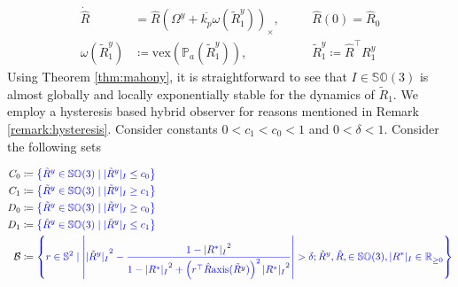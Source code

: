 \documentclass{article}
\newcommand{\SOthree}{\mathbb{SO}(3)}
\newcommand{\axis}[1]{\text{axis}(#1)}
\newcommand{\R}[1]{\mathbb{R}^{#1}}
\newcommand{\Omegay}{\Omega^y}
\newcommand{\vex}[1]{\text{vex}\left(#1\right)}
\newcommand{\brackets}[1]{\left(#1\right)}
\newcommand{\textblue}[1]{\textcolor{blue}{#1}}
\newcommand{\Rtilde}{\tilde{R}}
\newcommand{\normSOthree}[1]{{{\vert}#1 {\vert}_I}}
\newcommand{\Rstar}{{R^*}}
\begin{document}
\begin{subequations}\label{eq:unstable_observer}
\begin{alignat}{3}
    \dot{\hat{R}} &= \hat{R}\left( \Omegay + \overline{k_p}\omega(\Rtilde_1^y)\right)_\times, \quad &&\hat{R}(0) = \hat{R}_0 \\
    \omega(\Rtilde_1^y) &\coloneqq \vex{\mathbb{P}_a({\Rtilde_1^y})}, \quad &&{\Rtilde_1^y \coloneqq \hat{R}^\top R^y_1}
\end{alignat}
\end{subequations}
Using Theorem \ref{thm:mahony}, it is straightforward to see that  $I\in\SOthree$ is almost globally and locally exponentially stable for the dynamics of $\Rtilde_1$. We employ a hysteresis based hybrid observer for reasons mentioned in Remark \ref{remark:hysteresis}. Consider constants $ 0 < c_1 < c_0 < 1$ and $0<\delta < 1$. Consider the following sets

\begin{subequations}
\begin{align}
    C_0 &\coloneqq \textblue{\left\{\Rtilde^y \in \SOthree \mid \normSOthree{\Rtilde^y} \leq c_0 \right\}}\\
    C_1 &\coloneqq \textblue{\left\{\Rtilde^y \in \SOthree \mid \normSOthree{\Rtilde^y} \geq c_1 \right\}}\\
    D_0 &\coloneqq \textblue{\left\{\Rtilde^y \in \SOthree \mid \normSOthree{\Rtilde^y} \geq c_0 \right\}}\\
    D_1 &\coloneqq \textblue{\left\{\Rtilde^y \in \SOthree \mid \normSOthree{\Rtilde^y} \leq c_1 \right\}}\\
    \mathcal{B} &\coloneqq \textblue{\left\{r \in \mathbb{S}^2 \mid \left\lvert \normSOthree{\Rtilde^y}^2 - \frac{1 - \normSOthree{\Rstar}^2}{1 - \normSOthree{\Rstar}^2 + \brackets{r^\top \hat{R}\axis{\Rtilde^y}}^2 \normSOthree{\Rstar}^2} \right\rvert > \delta;  {\Rtilde^y}, {\hat{R}},\in\SOthree, \normSOthree{\Rstar} \in \R{}_{\geq 0}\right\}}
\end{align}
\end{subequations}
\end{document}
